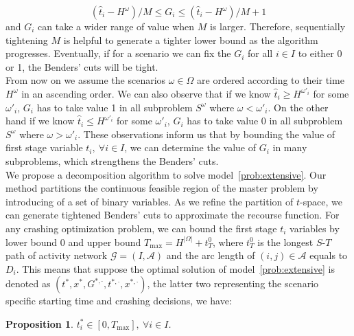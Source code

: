 \documentclass[11pt]{article}
\newtheorem{proposition}[theorem]{Proposition}
\begin{document}
	\begin{equation} \label{cons:Grange}
		(\hat{t}_i - H^\omega)/M \leq G_i \leq (\hat{t}_i - H^\omega)/M + 1
	\end{equation}
	and \(G_i\) can take a wider range of value when \(M\) is larger. Therefore, sequentially tightening \(M\) is helpful to generate a tighter lower bound as the algorithm progresses. Eventually, if for a scenario we can fix the \(G_i\) for all \(i \in I\) to either 0 or 1, the Benders' cuts will be tight.\\
	\newline
	From now on we assume the scenarios \(\omega \in \Omega\) are ordered according to their time \(H^\omega\) in an ascending order. We can also observe that if we know \(\hat{t}_i \geq H^{\omega'_i}\) for some \(\omega'_i\), \(G_i\) has to take value 1 in all subproblem \(S^\omega\) where \(\omega < \omega'_i\). On the other hand if we know \(\hat{t}_i \leq H^{\omega'_i}\) for some \(\omega'_i\), \(G_i\) has to take value 0 in all subproblem \(S^\omega\) where \(\omega > \omega'_i\). These observations inform us that by bounding the value of first stage variable \(t_i,\ \forall i \in I\), we can determine the value of \(G_i\) in many subproblems, which strengthens the Benders' cuts.\\
	\newline
	We propose a decomposition algorithm to solve model~\eqref{prob:extensive}. Our method partitions the continuous feasible region of the master problem by introducing of a set of binary variables. As we refine the partition of \(t\)-space, we can generate tightened Benders' cuts to approximate the recourse function. For any crashing optimization problem, we can bound the first stage \(t_i\) variables by lower bound \(0\) and upper bound \(T_{\max} = H^{|\Omega|} + t_T^0\), where \(t_T^0\) is the longest \(S\)-\(T\) path of activity network \(\mathcal{G} = (I,\mathcal{A})\) and the arc length of \((i,j) \in \mathcal{A}\) equals to \(D_i\). This means that suppose the optimal solution of model~\eqref{prob:extensive} is denoted as \((t^*,x^*,G^{*,\cdot},t^{*,\cdot},x^{*,\cdot})\), the latter two representing the scenario specific starting time and crashing decisions, we have:
	\begin{proposition} \label{prop:bounds}
		 \(t^*_i \in [0,T_{\max}],\ \forall i \in I\).
	\end{proposition}
\end{document}
